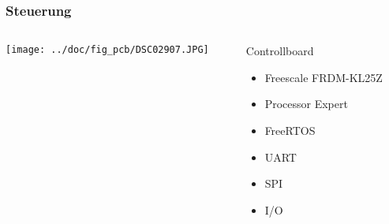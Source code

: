 \begin{frame}
    \frametitle{Steuerung}
    \begin{columns}
        \begin{column}{0.50\textwidth}
            \centering
            \texttt{[image: ../doc/fig\_pcb/DSC02907.JPG]}
        \end{column}
        \begin{column}{0.50\textwidth}
            \begin{block}{Controllboard}
                \begin{itemize}
                    \item Freescale FRDM-KL25Z
                    \item Processor Expert
                    \item FreeRTOS
                    \item UART
                    \item SPI
                    \item I/O
                \end{itemize}
            \end{block}
        \end{column}
    \end{columns}
\end{frame}

